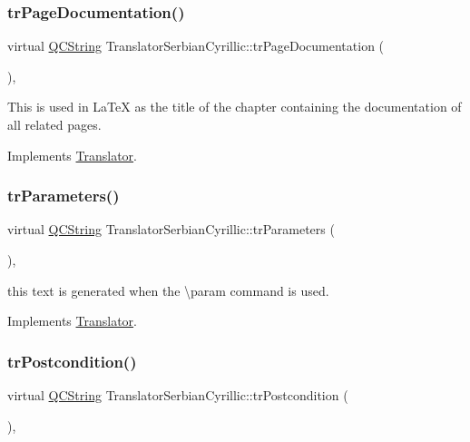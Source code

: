\subsubsection{\texorpdfstring{trPageDocumentation()}{trPageDocumentation()}}
{\footnotesize\ttfamily virtual \mbox{\hyperlink{class_q_c_string}{Q\+C\+String}} Translator\+Serbian\+Cyrillic\+::tr\+Page\+Documentation (\begin{DoxyParamCaption}{ }\end{DoxyParamCaption})\hspace{0.3cm}{\ttfamily [inline]}, {\ttfamily [virtual]}}

This is used in La\+TeX as the title of the chapter containing the documentation of all related pages. 

Implements \mbox{\hyperlink{class_translator}{Translator}}.

\mbox{\label{class_translator_serbian_cyrillic_ae37b55a1c3fa055d42891c5ccc4b37c9}} 
\subsubsection{\texorpdfstring{trParameters()}{trParameters()}}
{\footnotesize\ttfamily virtual \mbox{\hyperlink{class_q_c_string}{Q\+C\+String}} Translator\+Serbian\+Cyrillic\+::tr\+Parameters (\begin{DoxyParamCaption}{ }\end{DoxyParamCaption})\hspace{0.3cm}{\ttfamily [inline]}, {\ttfamily [virtual]}}

this text is generated when the \textbackslash{}param command is used. 

Implements \mbox{\hyperlink{class_translator}{Translator}}.

\mbox{\label{class_translator_serbian_cyrillic_aa7394384163a79b41ce563bcb6808d3d}} 
\subsubsection{\texorpdfstring{trPostcondition()}{trPostcondition()}}
{\footnotesize\ttfamily virtual \mbox{\hyperlink{class_q_c_string}{Q\+C\+String}} Translator\+Serbian\+Cyrillic\+::tr\+Postcondition (\begin{DoxyParamCaption}{ }\end{DoxyParamCaption})\hspace{0.3cm}{\ttfamily [inline]}, {\ttfamily [virtual]}}

